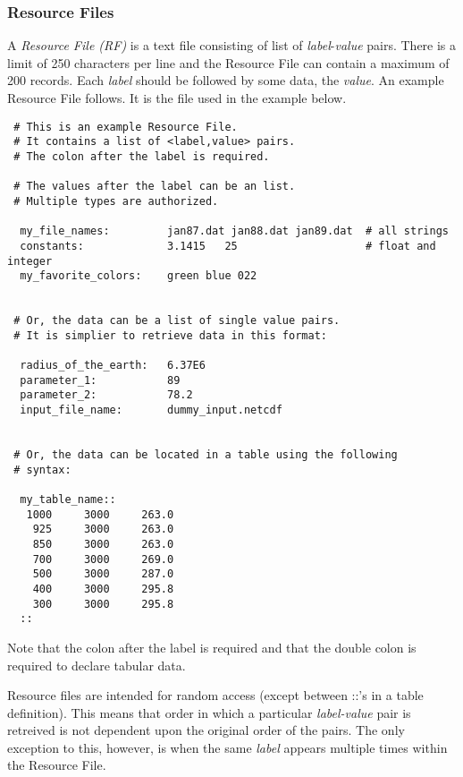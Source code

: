 
 \subsubsection{Resource Files}

   A {\em Resource File (RF)} is a text file consisting of list of 
   {\em label}-{\em value} pairs. There is a limit of 250 characters 
   per line and the Resource File can contain a maximum of 200 records. 
   Each {\em label} should be followed by some data, the {\em value}. 
   An example Resource File follows.  It is the file used in the example 
   below. 

 \begin{verbatim}
 # This is an example Resource File.  
 # It contains a list of <label,value> pairs.
 # The colon after the label is required. 

 # The values after the label can be an list.
 # Multiple types are authorized.
  
  my_file_names:         jan87.dat jan88.dat jan89.dat  # all strings
  constants:             3.1415   25                    # float and integer
  my_favorite_colors:    green blue 022               


 # Or, the data can be a list of single value pairs. 
 # It is simplier to retrieve data in this format:

  radius_of_the_earth:   6.37E6         
  parameter_1:           89
  parameter_2:           78.2
  input_file_name:       dummy_input.netcdf 


 # Or, the data can be located in a table using the following
 # syntax:

  my_table_name::
   1000     3000     263.0
    925     3000     263.0
    850     3000     263.0
    700     3000     269.0
    500     3000     287.0
    400     3000     295.8
    300     3000     295.8
  ::
 \end{verbatim}

 Note that the colon after the label is required and that the double colon is required
 to declare tabular data. 

 Resource files are intended for random access (except between ::'s in a 
 table definition). This means that order in which a particular 
 {\em label-value} pair is retreived is not dependent upon the original order 
 of the pairs. The only exception to this, however, is when the same {\em label} appears 
 multiple times within the Resource File.




